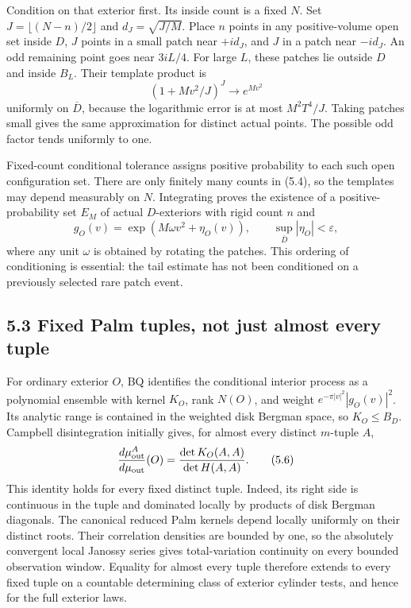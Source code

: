 \documentclass[11pt,a4paper]{article}
\theoremstyle{definition}
\theoremstyle{remark}
\numberwithin{equation}{section}
\begin{document}
Condition on that exterior first. Its inside count is a fixed \(N\). Set \(J=\lfloor(N-n)/2\rfloor\) and \(d_J=\sqrt{J/M}\). Place \(n\) points in any positive-volume open set inside \(D\), \(J\) points in a small patch near \(+id_J\), and \(J\) in a patch near \(-id_J\). An odd remaining point goes near \(3iL/4\). For large \(L\), these patches lie outside \(D\) and inside \(B_L\). Their template product is \[
(1+Mv^2/J)^J\longrightarrow e^{Mv^2}
\] uniformly on \(\overline D\), because the logarithmic error is at most \(M^2T^4/J\). Taking patches small gives the same approximation for distinct actual points. The possible odd factor tends uniformly to one.

Fixed-count conditional tolerance assigns positive probability to each such open configuration set. There are only finitely many counts in (5.4), so the templates may depend measurably on \(N\). Integrating proves the existence of a positive-probability set \(E_M\) of actual \(D\)-exteriors with rigid count \(n\) and \[
g_O(v)=\exp(M\omega v^2+\eta_O(v)),\qquad
\sup_{\overline D}|\eta_O|<\varepsilon,
\tag{5.5}
\] where any unit \(\omega\) is obtained by rotating the patches. This ordering of conditioning is essential: the tail estimate has not been conditioned on a previously selected rare patch event.

\hypertarget{fixed-palm-tuples-not-just-almost-every-tuple}{%
\subsection{5.3 Fixed Palm tuples, not just almost every tuple}\label{fixed-palm-tuples-not-just-almost-every-tuple}}

For ordinary exterior \(O\), BQ identifies the conditional interior process as a polynomial ensemble with kernel \(K_O\), rank \(N(O)\), and weight \(e^{-\pi|v|^2}|g_O(v)|^2\). Its analytic range is contained in the weighted disk Bergman space, so \(K_O\le B_D\). Campbell disintegration initially gives, for almost every distinct \(m\)-tuple \(A\), \[
\frac{d\mu^A_{\rm out}}{d\mu_{\rm out}}(O)
=\frac{\det K_O(A,A)}{\det H(A,A)}.
\tag{5.6}
\] This identity holds for every fixed distinct tuple. Indeed, its right side is continuous in the tuple and dominated locally by products of disk Bergman diagonals. The canonical reduced Palm kernels depend locally uniformly on their distinct roots. Their correlation densities are bounded by one, so the absolutely convergent local Janossy series gives total-variation continuity on every bounded observation window. Equality for almost every tuple therefore extends to every fixed tuple on a countable determining class of exterior cylinder tests, and hence for the full exterior laws.
\end{document}
